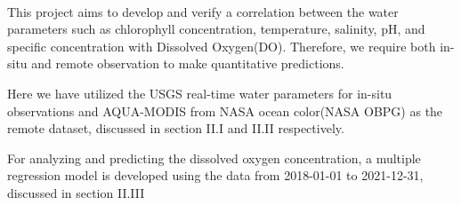 \paragraph{}
This project aims to develop and verify a correlation between the water parameters such as chlorophyll concentration, temperature, salinity, pH, and specific concentration with Dissolved Oxygen(DO).
Therefore, we require both in-situ and remote observation to make quantitative predictions. 

Here we have utilized the USGS real-time water parameters for in-situ observations and AQUA-MODIS from NASA ocean color(NASA OBPG) as the remote dataset, discussed in section II.I and II.II respectively.

For analyzing and predicting the dissolved oxygen concentration, a multiple regression model is developed using the data from 2018-01-01 to 2021-12-31, discussed in section II.III
